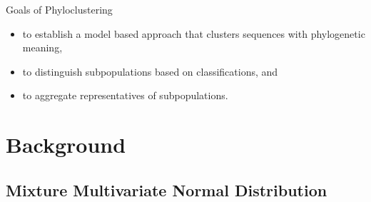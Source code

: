 \documentclass{beamer}
\begin{document}

\begin{frame}{Goals of Phyloclustering}
\begin{itemize}
\item to establish a model based approach that clusters sequences
      with phylogenetic meaning,
\item to distinguish subpopulations based on classifications, and 
\item to aggregate representatives of subpopulations.
\end{itemize}
\end{frame}


\section{Background}

\subsection{Mixture Multivariate Normal Distribution}
\end{document}
